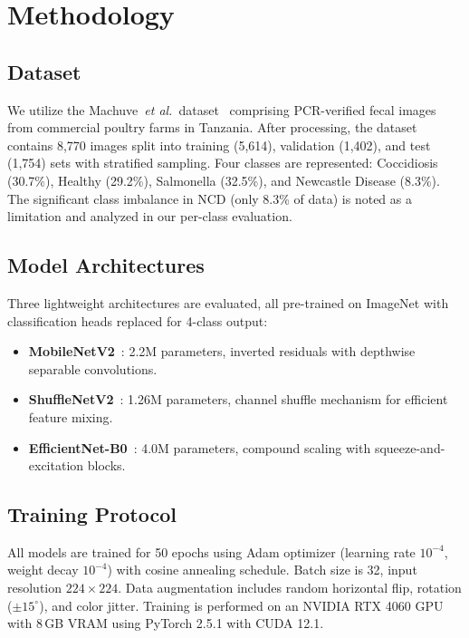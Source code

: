 \documentclass[conference,a4paper]{IEEEtran}
\begin{document}
\section{Methodology}

\subsection{Dataset}
We utilize the Machuve~\textit{et al.}~dataset~\cite{machuve22} comprising PCR-verified fecal images from commercial poultry farms in Tanzania. After processing, the dataset contains 8,770 images split into training (5,614), validation (1,402), and test (1,754) sets with stratified sampling. Four classes are represented: Coccidiosis (30.7\%), Healthy (29.2\%), Salmonella (32.5\%), and Newcastle Disease (8.3\%). The significant class imbalance in NCD (only 8.3\% of data) is noted as a limitation and analyzed in our per-class evaluation.

\subsection{Model Architectures}
Three lightweight architectures are evaluated, all pre-trained on ImageNet with classification heads replaced for 4-class output:

\begin{itemize}
    \item \textbf{MobileNetV2}~\cite{mobilenetv2}: 2.2M parameters, inverted residuals with depthwise separable convolutions.
    \item \textbf{ShuffleNetV2}~\cite{shufflenetv2}: 1.26M parameters, channel shuffle mechanism for efficient feature mixing.
    \item \textbf{EfficientNet-B0}~\cite{efficientnet}: 4.0M parameters, compound scaling with squeeze-and-excitation blocks.
\end{itemize}

\subsection{Training Protocol}
All models are trained for 50 epochs using Adam optimizer (learning rate $10^{-4}$, weight decay $10^{-4}$) with cosine annealing schedule. Batch size is 32, input resolution $224 \times 224$. Data augmentation includes random horizontal flip, rotation ($\pm 15^\circ$), and color jitter. Training is performed on an NVIDIA RTX 4060 GPU with 8\,GB VRAM using PyTorch 2.5.1 with CUDA 12.1.
\end{document}
